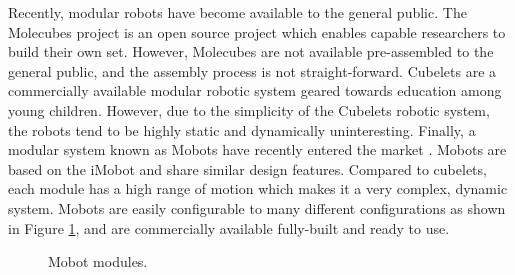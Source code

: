     Recently, modular robots have become available to the general public. 
    The Molecubes project is an open source project which enables capable researchers
      to build their own set. 
    However, Molecubes are not available pre-assembled to the general public,
      and the assembly process is not straight-forward. 
    Cubelets \cite{cubelets_website} are a commercially available modular robotic system
      geared towards education among young children. 
    However, due to the simplicity of the Cubelets robotic system, the robots
      tend to be highly static and dynamically uninteresting. 
    Finally, a modular system known as Mobots have recently entered the market
    \cite{barobo_website}. Mobots are based on the
      iMobot\cite{Ryland2010} and share similar design features. 
    Compared to cubelets, each module has a high range of motion which makes it
      a very complex, dynamic system. 
    Mobots are easily configurable to many different configurations as shown in
      Figure \ref{fig:mobot_modules}, and are commercially available
      fully-built and ready to use.

    \begin{figure}[!ht]
    \begin{center}
    \end{center}
    \caption{\label{fig:mobot_modules}Mobot modules.}
    \end{figure}

